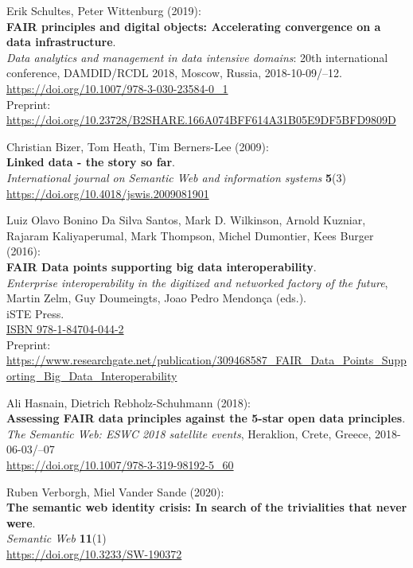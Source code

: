 \begin{thebibliography}{9}
Erik Schultes, Peter Wittenburg (2019): \\
\textbf{FAIR principles and digital objects: Accelerating convergence on a data infrastructure}.\\
\emph{Data analytics and management in data intensive domains}: 20th international conference,
{DAMDID}/{RCDL} 2018, Moscow, Russia, 2018-10-09/--12. \\
\url{https://doi.org/10.1007/978-3-030-23584-0_1}\\
Preprint: \url{https://doi.org/10.23728/B2SHARE.166A074BFF614A31B05E9DF5BFD9809D}

Christian Bizer, Tom Heath, Tim Berners-Lee (2009): \\
\textbf{Linked data - the story so far}. \\
\emph{International journal on Semantic Web and information systems} \textbf{5}(3) \\
\url{https://doi.org/10.4018/jswis.2009081901}

Luiz Olavo Bonino Da Silva Santos, Mark D. Wilkinson, Arnold Kuzniar,
Rajaram Kaliyaperumal, Mark Thompson, Michel Dumontier, Kees Burger
(2016):\\
\textbf{FAIR Data points supporting big data interoperability}. \\
\emph{Enterprise interoperability in the digitized and networked factory of the future}, Martin Zelm, Guy Doumeingts, Joao Pedro Mendonça (eds.).\\
iSTE Press. \\
\href{http://www.iste.co.uk/book.php?id=1073}{ISBN 978-1-84704-044-2} \\
Preprint: \url{https://www.researchgate.net/publication/309468587_FAIR_Data_Points_Supporting_Big_Data_Interoperability}

Ali Hasnain, Dietrich Rebholz-Schuhmann (2018): \\
\textbf{Assessing FAIR data principles against the 5-star open data principles}. \\
\emph{The Semantic Web: ESWC 2018 satellite events}, Heraklion, Crete, Greece, 2018-06-03/--07 \\
\url{https://doi.org/10.1007/978-3-319-98192-5_60}

Ruben Verborgh, Miel Vander Sande (2020): \\
\textbf{The semantic web identity crisis: In search of the trivialities that never were}.\\
\emph{Semantic Web} \textbf{11}(1)\\
\url{https://doi.org/10.3233/SW-190372}


\end{thebibliography}

